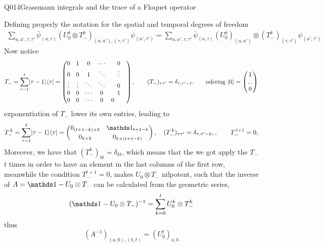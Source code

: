 \begin{entry}{Q014}{Grassmann integrals and the trace of a Floquet operator}
\begin{solution}[Part (c)]
Defining properly the notation for the spatial and temporal degrees of freedom
\begin{equation}
\begin{split}
    \sum_{a,a',\tau,\tau'} \bar \psi_{(a,\tau)} (U^k_0\otimes T_-^k)_{(a,a'),(\tau,\tau')} \psi_{(a',\tau')}= \sum_{a,a',\tau,\tau'} \bar \psi_{(a,\tau)} (U^k_0)_{(a,a')}\otimes (T_-^k)_{(\tau,\tau')} \psi_{(a',\tau')}
\end{split}
\end{equation}
Now notice 
\begin{equation}
    T_-=\sum_{\tau=1}^{t}\lvert \tau-1 \rangle\langle \tau \rvert
=\begin{pmatrix}
0 & 1 & 0 & \cdots & 0 \\
0 & 0 & 1 & \ddots & \vdots \\
\vdots & \vdots & \ddots & \ddots & 0 \\
0 & 0 & \cdots & 0 & 1 \\
0 & 0 & \cdots & 0 & 0 \qquad 
\end{pmatrix},
\qquad
(T_-)_{\tau\tau'}=\delta_{\tau,\tau'-1}. \qquad \text{odering}\ \lvert 0 \rangle = \begin{pmatrix}
    1\\
    ...\\
    0
\end{pmatrix}
\end{equation}
exponentiation of $T_-$ lower its own entries, leading to
\begin{equation}
T_-^{\,k}=\sum_{\tau=1}^{t}\ket{\tau-1}\bra{\tau}
=\begin{pmatrix}
0_{(t+1-k)\times k} & \id_{t+1-k} \\[2pt]
0_{k\times k} & 0_{k\times(t+1-k)}
\end{pmatrix},
\quad (T_-^{\,k})_{\tau\tau'}=\delta_{\tau,\tau'-k},,
\qquad T_-^{\,t+1}=0 ,
\end{equation}
Moreover, we have that $(T_-^k)_{0t} = \delta_{kt}$, which means that the we got apply the $T_-$ $t$ times in order to have an element in the last columns of the first row, meanwhile the condition $T_{-}^{t+1}=0$, makes $U_0\otimes T_-$ nilpotent, such that the inverse of $A=\id-U_0\otimes T_-$ can be calculated from the geometric series, 
\begin{equation}
    (\id -U_0\otimes T_-)^{-1}= \sum_{k=0}^t U_0^k \otimes T_{-}^k
\end{equation}
 thus
\begin{equation}
    (A^{-1})_{(a,0),(b,t)}= (U_0^t)_{a,b}

\end{equation}
\end{solution}
\end{entry}
